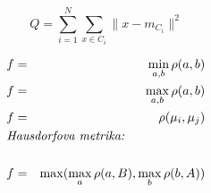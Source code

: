 \begin{equation}
Q=\sum\limits_{i=1}^N\sum\limits_{x\in C_i}\|x-m_{C_i}\|^2
\end{equation}


\begin{enumerate}
\end{enumerate}



\begin{itemize}
\end{itemize}


\begin{eqnarray}
f&=&\min\limits_{a,b}\rho(a,b)\\
f&=&\max\limits_{a,b}\rho(a,b)\\
f&=&\rho(\mu_i,\mu_j)\\
\noalign{\hbox{{\em Hausdorfova metrika: }}}\nonumber\\ 
f&=&\max(\max\limits_a\rho(a,B),\max\limits_b\rho(b,A))
\end{eqnarray}




